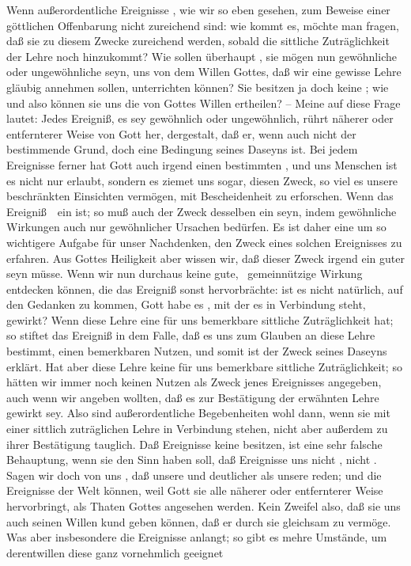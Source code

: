 Wenn außerordentliche Ereignisse , wie wir so eben gesehen, zum Beweise einer göttlichen Offenbarung nicht zureichend sind: wie kommt es, möchte man fragen, daß sie zu diesem Zwecke zureichend werden, sobald die sittliche Zuträglichkeit der Lehre noch hinzukommt? Wie sollen überhaupt , sie mögen nun gewöhnliche oder ungewöhnliche seyn, uns von dem Willen Gottes, daß wir eine gewisse Lehre gläubig annehmen sollen, unterrichten können? Sie besitzen ja doch keine ; wie und  also können sie uns die  von Gottes Willen ertheilen? -- Meine  auf diese Frage lautet: Jedes Ereigniß, es sey gewöhnlich oder ungewöhnlich, rührt näherer oder entfernterer Weise von Gott her, dergestalt, daß er, wenn auch nicht der bestimmende Grund, doch eine Bedingung seines Daseyns ist. Bei jedem Ereignisse ferner hat Gott auch irgend einen bestimmten , und uns Menschen ist es nicht nur erlaubt, sondern es ziemet uns sogar, diesen Zweck, so viel es unsere beschränkten Einsichten vermögen, mit Bescheidenheit zu erforschen. Wenn das Ereigniß~\ ein  ist; so muß auch der Zweck desselben ein  seyn, indem gewöhnliche Wirkungen auch nur gewöhnlicher Ursachen bedürfen. Es ist daher eine um so wichtigere Aufgabe für unser Nachdenken, den Zweck eines solchen Ereignisses zu erfahren. Aus Gottes Heiligkeit aber wissen wir, daß dieser Zweck irgend ein guter seyn müsse. Wenn wir nun durchaus keine gute, \dh\ gemeinnützige Wirkung entdecken können, die das Ereigniß sonst hervorbrächte: ist es nicht natürlich, auf den Gedanken zu kommen, Gott habe es , mit der es in Verbindung steht, gewirkt? Wenn diese Lehre eine für uns bemerkbare sittliche Zuträglichkeit hat; so stiftet das Ereigniß in dem Falle, daß es uns zum Glauben an diese Lehre bestimmt, einen bemerkbaren Nutzen, und somit ist der Zweck seines Daseyns erklärt. Hat aber diese Lehre keine für uns bemerkbare sittliche Zuträglichkeit; so hätten wir immer noch keinen Nutzen als Zweck jenes Ereignisses angegeben, auch wenn wir angeben wollten, daß es zur Bestätigung der erwähnten Lehre gewirkt sey. Also sind außerordentliche Begebenheiten wohl dann, wenn sie mit einer sittlich zuträglichen Lehre in Verbindung stehen, nicht aber außerdem zu ihrer Bestätigung tauglich. Daß Ereignisse keine  besitzen, ist eine sehr falsche Behauptung, wenn sie den Sinn haben soll, daß Ereignisse uns nicht , nicht . Sagen wir doch von uns , daß unsere  und deutlicher als unsere  reden; und die Ereignisse der Welt können, weil Gott sie alle näherer oder entfernterer Weise hervorbringt, als Thaten Gottes angesehen werden. Kein Zweifel also, daß sie uns auch seinen Willen kund geben können, daß er durch sie gleichsam zu  vermöge. Was aber insbesondere die  Ereignisse anlangt; so gibt es mehre Umstände, um derentwillen diese ganz vornehmlich geeignet 